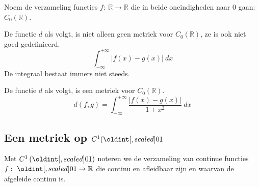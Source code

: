 \documentclass[main.tex]{subfiles}
\begin{document}
\begin{de}
  Noem de verzameling functies $f:\ \mathbb{R} \rightarrow \mathbb{R}$ die in beide oneindigheden naar $0$ gaan: $C_{0}(\mathbb{R})$.
\end{de}

\begin{vb}
  De functie $d$ als volgt, is niet alleen geen metriek voor $C_{0}(\mathbb{R})$, ze is ook niet goed gedefinieerd.
  \[ \int_{-\infty}^{+\infty}|f(x)-g(x)|\ dx \]
  De integraal bestaat immers niet steeds.
\end{vb}

\begin{vb}
  De functie $d$ als volgt, is een metriek voor $C_{0}(\mathbb{R})$.
  \[ d(f,g) = \int_{-\infty}^{+\infty}\frac{|f(x)-g(x)|}{1+x^{2}}\ dx \]
\end{vb}

\subsection{Een metriek op $C^{1}(\interval{0}{1}$}

\begin{de}
  Met $C^{1}\left(\interval{0}{1}\right)$ noteren we de verzameling van continue functies $f:\ \interval{0}{1} \rightarrow \mathbb{R}$ die continu en afleidbaar zijn en waarvan de afgeleide continu is.
\end{de}
\end{document}
